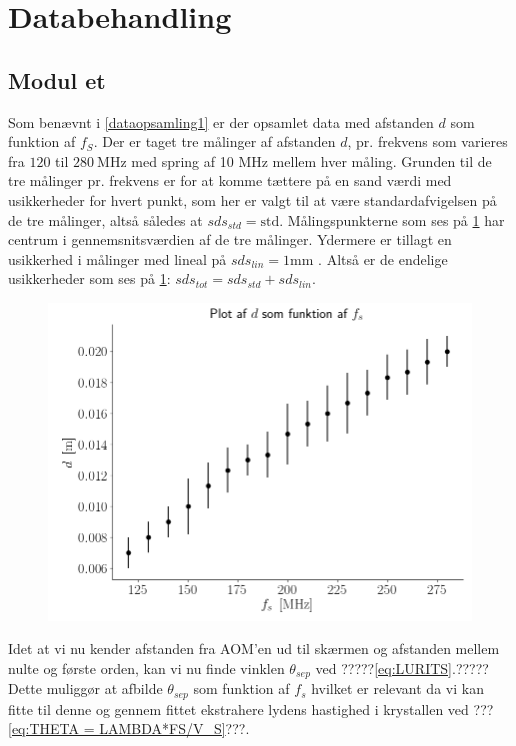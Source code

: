 \documentclass[main]{subfiles}
\begin{document}
\section{Databehandling}
\subsection{Modul et}
Som benævnt i \cref{dataopsamling1} er der opsamlet data med afstanden $d$ som funktion af $f_S$. Der er taget tre målinger af afstanden $d$, pr. frekvens som varieres fra $120$ til $280 \ \si{\mega\hertz}$ med spring af 10 $\si{\mega\hertz}$ mellem hver måling. Grunden til de tre målinger pr. frekvens er for at komme tættere på en sand værdi med usikkerheder for hvert punkt, som her er valgt til at være standardafvigelsen på de tre målinger, altså således at $sds_{std} = \text{std}$. Målingspunkterne som ses på \cref{fig:rawdata_modul1} har centrum i gennemsnitsværdien af de tre målinger. Ydermere er tillagt en usikkerhed i målinger med lineal på
$ sds_{lin} = 1 \si{\milli\meter} $ . Altså er de endelige usikkerheder som ses på \cref{fig:rawdata_modul1}:  $ sds_{tot} = sds_{std} + sds_{lin} $.
\begin{figure}[H]
    \centering
    \includegraphics[width=\linewidth]{tegninger/rawdata_modul1.png}
    \caption{}
    \label{fig:rawdata_modul1}
\end{figure}
Idet at vi nu kender afstanden fra AOM'en ud til skærmen og afstanden mellem nulte og første orden, kan vi nu finde vinklen $\theta_{sep}$ ved ?????\cref{eq:LURITS}.?????%
Dette muliggør at afbilde $\theta_{sep}$ som funktion af $f_s$ hvilket er relevant da vi kan fitte til denne og gennem fittet ekstrahere lydens hastighed i krystallen ved ???\cref{eq:THETA = LAMBDA*FS/V_S}???. %
\end{document}
